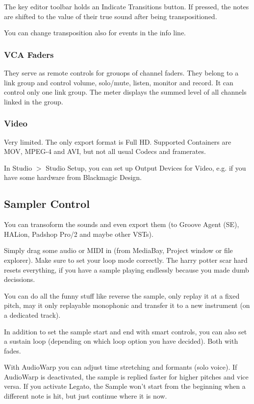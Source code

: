 \documentclass[10pt]{article}
\begin{document}
The key editor toolbar holds an Indicate Transitions button. If pressed, the notes are shifted to the value of their true sound after being transpositioned.

You can change transposition also for events in the info line.

\subsubsection{VCA Faders}

They serve as remote controls for grouops of channel faders. They belong to a link group and control volume, solo/mute, listen, monitor and record. It can control only one link group. The meter displays the summed level of all channels linked in the group.

\subsubsection{Video}

Very limited. The only export format is Full HD. Supported Containers are MOV, MPEG-4 and AVI, but not all usual Codecs and framerates.

In Studio $>$ Studio Setup, you can set up Output Devices for Video, e.g. if you have some hardware from Blackmagic Design.



\subsection{Sampler Control}\hypertarget{SampContr}{}

You can transoform the sounds and even export them (to Groove Agent (SE), HALion, Padshop Pro/2 and maybe other VSTs).

Simply drag some audio or MIDI in (from MediaBay, Project window or file explorer). Make sure to set your loop mode correctly. The harry potter scar hard resets everything, if you have a sample playing endlessly because you made dumb decissions.

You can do all the funny stuff like reverse the sample, only replay it at a fixed pitch, may it only replayable monophonic and transfer it to a new instrument (on a dedicated track).

In addition to set the sample start and end with smart controls, you can also set a sustain loop (depending on which loop option you have decided). Both with fades.

With AudioWarp you can adjust time stretching and formants (solo voice). If AudioWarp is deactivated, the sample is replied faster for higher pitches and vice versa. If you activate Legato, the Sample won't start from the beginning when a different note is hit, but just continue where it is now.
\end{document}
